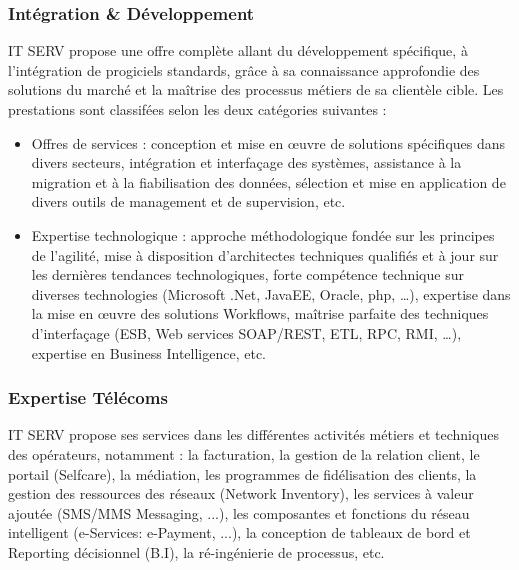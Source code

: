 \begin{spacing}{1.5}
\subsubsection*{Intégration \& Développement} %
IT SERV propose une offre complète allant du développement spécifique, à l’intégration de progiciels standards, grâce à sa connaissance approfondie des solutions du marché et la maîtrise des processus métiers de sa clientèle cible. Les prestations sont classifées selon les deux catégories suivantes :
\begin{itemize}
    \item Offres de services : conception et mise en œuvre de solutions spécifiques dans divers secteurs, intégration et interfaçage des systèmes, assistance à la migration et à la fiabilisation des données, sélection et mise en application de divers outils de management et de supervision, etc.
    \item Expertise technologique : approche méthodologique fondée sur les principes de l’agilité, mise à disposition d'architectes techniques qualifiés et à jour sur les dernières tendances technologiques, forte compétence technique sur diverses technologies (Microsoft .Net, JavaEE, Oracle, php, …), expertise dans la mise en œuvre des solutions Workflows, maîtrise parfaite des techniques d’interfaçage (ESB, Web services SOAP/REST, ETL, RPC, RMI, …), expertise en Business Intelligence, etc.
\end{itemize}
\subsubsection*{Expertise Télécoms} %
IT SERV propose ses services dans les différentes activités métiers et techniques des opérateurs, notamment : la facturation, la gestion de la relation client, le portail (Selfcare), la médiation, les programmes de fidélisation des clients, la gestion des ressources des réseaux (Network Inventory), les services à valeur ajoutée (SMS/MMS Messaging, ...), les composantes et fonctions du réseau intelligent (e-Services: e-Payment, ...), la conception de tableaux de bord et Reporting décisionnel (B.I), la ré-ingénierie de processus, etc.

\end{spacing}

